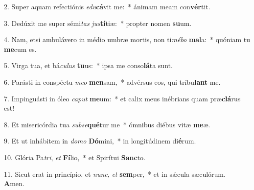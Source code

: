 2. Super aquam refectiónis \textit{e}\textit{du}\textbf{cá}vit me:~*  ánimam meam con\textbf{vér}tit.\

3. Dedúxit me super sémi\textit{tas} \textit{jus}\textbf{tí}tiæ:~*  propter nomen \textbf{su}um.\

4. Nam, etsi ambulávero in médio umbræ mortis, non ti\textit{mé}\textit{bo} \textbf{ma}la:~*  quóniam tu \textbf{me}cum es.\

5. Virga tua, et bá\textit{cu}\textit{lus} \textbf{tu}us:~*  ipsa me conso\textbf{lá}ta sunt.\

6. Parásti in conspéctu \textit{me}\textit{o} \textbf{men}sam,~*  advérsus eos, qui tríbu\textbf{lant} me.\

7. Impinguásti in óleo \textit{ca}\textit{put} \textbf{me}um:~*  et calix meus inébrians quam præ\textbf{clá}rus est!\

8. Et misericórdia tua \textit{sub}\textit{se}\textbf{qué}tur me~*  ómnibus diébus vitæ \textbf{me}æ.\

9. Et ut inhábitem in \textit{do}\textit{mo} \textbf{Dó}mini,~*  in longitúdinem di\textbf{é}rum.\

10. Glória Pa\textit{tri}, \textit{et} \textbf{Fí}lio,~*  et Spirítui \textbf{Sanc}to.\

11. Sicut erat in princípio, et \textit{nunc}, \textit{et} \textbf{sem}per,~*  et in sǽcula sæculórum. \textbf{A}men.\

